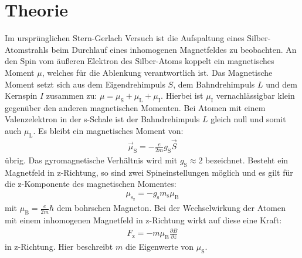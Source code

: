 \section{Theorie}
\label{sec:Theorie}
Im ursprünglichen Stern-Gerlach Versuch ist die Aufspaltung eines Silber-Atomstrahls beim
Durchlauf eines inhomogenen Magnetfeldes zu beobachten.
An den Spin vom äußeren Elektron des Silber-Atoms koppelt ein magnetisches
Moment $\mu$, welches für die Ablenkung verantwortlich ist.
Das Magnetische Moment setzt sich aus dem Eigendrehimpuls $S$,
dem Bahndrehimpuls $L$ und dem Kernspin $I$ zusammen zu: $\mu=\mu_\mathrm{S}+\mu_\mathrm{L}+\mu_\mathrm{I}$.
Hierbei ist $\mu_\mathrm{I}$ vernachlässigbar klein gegenüber den anderen
magnetischen Momenten.
Bei Atomen mit einem Valenzelektron in der s-Schale ist der Bahndrehimpuls
$L$ gleich null und somit auch $\mu_\mathrm{L}$.
Es bleibt ein magnetisches Moment von:
\begin{align}
  \vec{\mu}_\mathrm{S}=-\frac{e}{2m}g_\mathrm{S}\vec{S}
\end{align}
übrig. Das gyromagnetische Verhältnis wird mit $g_\mathrm{S}\approx 2$ bezeichnet.
Besteht ein Magnetfeld in z-Richtung, so sind zwei Spineinstellungen möglich und
es gilt für die z-Komponente des magnetischen Momentes:
\begin{align}
  \mu_\mathrm{s_\mathrm{z}}=-g_\mathrm{s}m_\mathrm{s}\mu_\mathrm{B}
\end{align}
mit $\mu_\mathrm{B}=\frac{e}{2m}\hbar$ dem bohrschen Magneton.
Bei der Wechselwirkung der Atomen mit einem inhomogenen Magnetfeld
in z-Richtung wirkt auf diese eine Kraft:
\begin{align}
  F_\mathrm{z}=-m\mu_\mathrm{B}\frac{\partial B}{\partial z}
\end{align}
in z-Richtung. Hier beschreibt $m$ die Eigenwerte von $\mu_\mathrm{S}$.

